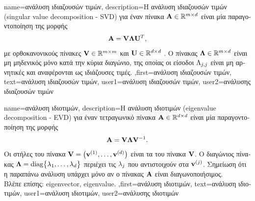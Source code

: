 {name={\foreignlanguage{greek}{ανάλυση ιδιαζουσών τιμών}}, 
  	description={\foreignlanguage{greek}{Η ανάλυση ιδιαζουσών τιμών} (singular value decomposition - SVD) 
  		\foreignlanguage{greek}{για έναν πίνακα ${\bf A} \in \mathbb{R}^{m \times d}$ 
		είναι μία παραγοντοποί\-ηση της μορφής  
		$${\bf A} = \mathbf{V} {\bm \Lambda} \mathbf{U}^{T},$$ 
		με ορθοκανονικούς πίνακες $\mathbf{V} \in \mathbb{R}^{m \times m}$ 
		και} $\mathbf{U} \in \mathbb{R}^{d \times d}$ \cite{GolubVanLoanBook}. 
		\foreignlanguage{greek}{Ο πίνακας ${\bm \Lambda} \in \mathbb{R}^{m \times d}$ είναι 
		μη μηδενικός μόνο κατά την κύρια διαγώνιο, της οποίας οι είσοδοι $\Lambda_{j,j}$ 
		είναι μη αρνητικές και αναφέρονται ως ιδιάζουσες τιμές.} 
	},first={\foreignlanguage{greek}{ανάλυση ιδιαζουσών τιμών}},
	text={\foreignlanguage{greek}{ανάλυση ιδιαζουσών τιμών}},
	user1={\foreignlanguage{greek}{ανάλυση ιδιαζουσών τιμών}}, %
	user2={\foreignlanguage{greek}{ανάλυσης ιδιαζουσών τιμών}} %
}

{name={\foreignlanguage{greek}{ανάλυση ιδιοτιμών}}, 
	description={\foreignlanguage{greek}{Η ανάλυση ιδιοτιμών} 
		(eigenvalue decomposition - EVD) \foreignlanguage{greek}{για έναν τετραγωνικό πίνακα ${\bf A} \in \mathbb{R}^{d \times d}$ 
		είναι μία παραγοντοποίηση της μορφής  
		$${\bf A} = \mathbf{V} {\bm \Lambda} \mathbf{V}^{-1}.$$ 
		Οι στήλες του πίνακα $\mathbf{V} = \big( {\bf v}^{(1)},\ldots,{\bf v}^{(d)} \big)$ είναι τα}  
		 \foreignlanguage{greek}{του πίνακα $\mathbf{V}$. Ο διαγώνιος πίνακας  
		${\bm \Lambda} = {\rm diag} \big\{ \lambda_{1},\ldots,\lambda_{d} \big\}$ 
		περιέχει τις}  $\lambda_{j}$ \foreignlanguage{greek}{που αντιστοιχούν στα}  
		${\bf v}^{(j)}$. \foreignlanguage{greek}{Σημείωση ότι η παραπάνω ανάλυση υπάρχει μόνο αν ο πίνακας ${\bf A}$ είναι διαγωνοποιήσιμος.}\\
		\foreignlanguage{greek}{Βλέπε επίσης:} \gls{eigenvector}, \gls{eigenvalue}.
		},first={\foreignlanguage{greek}{ανάλυση ιδιοτιμών}},
		text={\foreignlanguage{greek}{ανάλυση ιδιοτιμών}},
		user1={\foreignlanguage{greek}{ανάλυση ιδιοτιμών}}, %
		user2={\foreignlanguage{greek}{ανάλυσης ιδιοτιμών}} %
}

